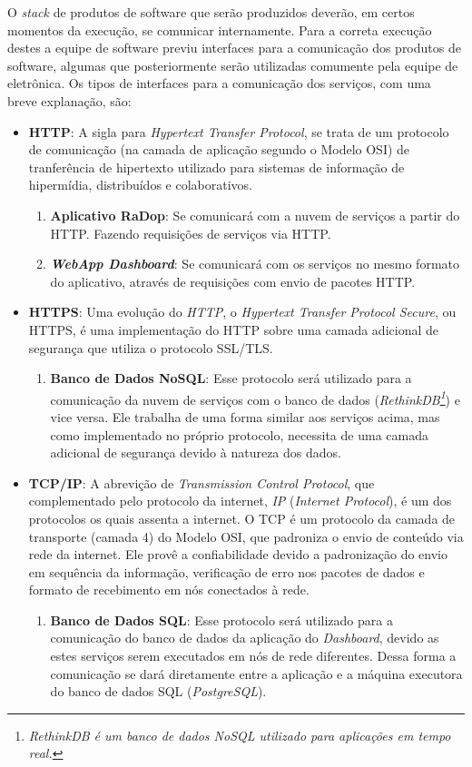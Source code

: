 O \textit{stack} de produtos de software que serão produzidos deverão, em certos momentos da execução, se comunicar internamente. Para a correta execução destes a equipe de software previu interfaces para a comunicação dos produtos de software, algumas que posteriormente serão utilizadas comumente pela equipe de eletrônica.
Os tipos de interfaces para a comunicação dos serviços, com uma breve explanação, são:
\begin{itemize}
    \item \textbf{HTTP}:
    A sigla para \textit{Hypertext Transfer Protocol}, se trata de um protocolo de comunicação (na camada de aplicação segundo o Modelo OSI) de tranferência de hipertexto utilizado para sistemas de informação de hipermídia, distribuídos e colaborativos.
    \begin{enumerate}
        \item \textbf{Aplicativo RaDop}: Se comunicará com a nuvem de serviços a partir do HTTP. Fazendo requisições de serviços via HTTP.
        \item \textbf{\textit{WebApp Dashboard}}: Se comunicará com os serviços no mesmo formato do aplicativo, através de requisições com envio de pacotes HTTP.
    \end{enumerate}
    \item \textbf{HTTPS}:
    Uma evolução do \textit{HTTP}, o \textit{Hypertext Transfer Protocol Secure}, ou HTTPS, é uma implementação do HTTP sobre uma camada adicional de segurança que utiliza o protocolo SSL/TLS.
    \begin{enumerate}
        \item \textbf{Banco de Dados NoSQL}: Esse protocolo será utilizado para a comunicação da nuvem de serviços com o banco de dados (\textit{RethinkDB\footnote{\textit{RethinkDB é um banco de dados \textit{NoSQL} utilizado para aplicações em tempo real.}}}) e vice versa. Ele trabalha de uma forma similar aos serviços acima, mas como implementado no próprio protocolo, necessita de uma camada adicional de segurança devido à natureza dos dados.
    \end{enumerate}
    \item \textbf{TCP/IP}:
    A abrevição de \textit{Transmission Control Protocol}, que complementado pelo protocolo da internet, \textit{IP} (\textit{Internet Protocol}), é um dos protocolos os quais assenta a internet. O TCP é um protocolo da camada de transporte (camada 4) do Modelo OSI, que padroniza o envio de conteúdo via rede da internet. Ele provê a confiabilidade devido a padronização do envio em sequência da informação, verificação de erro nos pacotes de dados e formato de recebimento em nós conectados à rede.
    \begin{enumerate}
        \item \textbf{Banco de Dados SQL}: Esse protocolo será utilizado para a comunicação do banco de dados da aplicação do \textit{Dashboard}, devido as estes serviços serem executados em nós de rede diferentes. Dessa forma a comunicação se dará diretamente entre a aplicação e a máquina executora do banco de dados SQL (\textit{PostgreSQL}).
    \end{enumerate}
\end{itemize}

